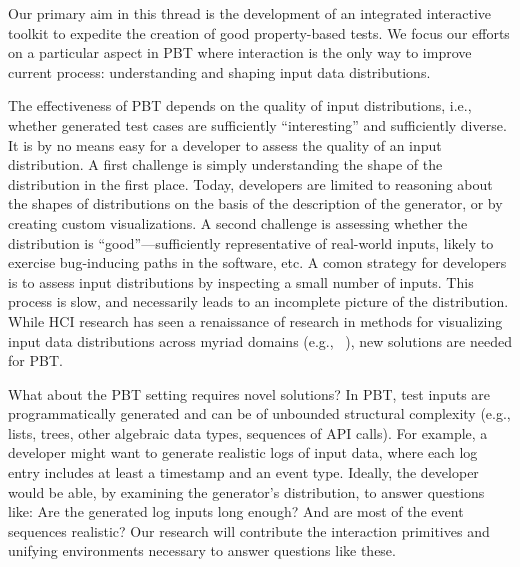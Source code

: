 %
Our primary aim in this thread is the development of an integrated interactive toolkit to expedite the creation of good property-based tests. We focus our efforts on a particular aspect in PBT where interaction is the only way to improve current process: understanding and shaping input data distributions.

The effectiveness of PBT depends on the quality of input distributions, i.e., whether generated test cases are sufficiently ``interesting'' and sufficiently diverse.
It is by no means easy for a developer to assess the quality of
an input distribution. A first challenge is simply understanding the shape of the distribution in the first place. Today, developers are limited to reasoning about the shapes of distributions on the basis of the description of the generator, or by creating custom visualizations. A second challenge is assessing whether the distribution is ``good''---sufficiently representative of real-world inputs, likely to exercise bug-inducing paths in the software, etc.
A comon strategy for developers is to assess input distributions by inspecting a
small number of inputs. This process is slow, and necessarily leads to an incomplete picture of the distribution.
While HCI research has seen a renaissance of research in methods for visualizing input data distributions across myriad domains (e.g.,
~\cite{ref:hohman2019gamut,ref:hohman2020understanding,ref:kang2017omnicode}), new solutions are needed for PBT.

What about the PBT setting requires novel solutions?
In PBT, test inputs are
programmatically generated and
can be of unbounded structural
complexity (e.g., lists, trees, other algebraic data types,
sequences of API calls).
For example, a developer might want to generate
realistic logs of input data, where each log entry includes at least a timestamp
and an event type.
%
Ideally, the developer would be able, by examining the generator's
distribution, to answer
questions like: Are the generated log inputs long enough? And are most
of the event sequences realistic?
Our research will contribute the interaction primitives and
 unifying environments necessary to answer questions like these.

